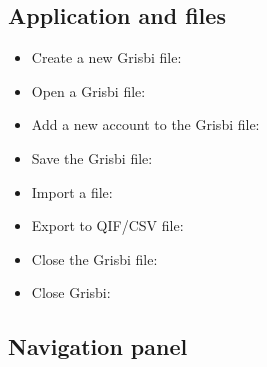\subsection{Application and files}

\begin{itemize}
	\item Create a new Grisbi file: %
	\item Open a Grisbi file: %
	\item Add a new account to the Grisbi file: %
	\item Save the Grisbi file: %
	\item Import a file: %
	\item Export to \gls{QIF}/\gls{CSV} file: %
	\item Close the Grisbi file: %
	\item Close Grisbi: %
\end{itemize}



\subsection{Navigation panel}


